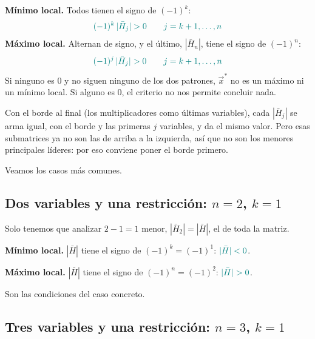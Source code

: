 \documentclass{article}
\newcommand{\vect}[1]{\vec{#1}}
\begin{document}
\begin{figure}[H]
\begin{minipage}[t]{0.49\textwidth}
\end{minipage}
\end{figure}

\noindent\textbf{Mínimo local.} Todos tienen el signo de \((-1)^k\):
\[\color{teal}
(-1)^k\,|\bar H_j|>0\qquad j=k+1,\dots,n
\]
\noindent\textbf{Máximo local.} Alternan de signo, y el último, \(|\bar H_n|\), tiene el signo de \((-1)^n\):
\[\color{teal}
(-1)^j\,|\bar H_j|>0\qquad j=k+1,\dots,n
\]
Si ninguno es \(0\) y no siguen ninguno de los dos patrones, \(\vect{x}^*\) no es un máximo ni un mínimo local. Si alguno es \(0\), el criterio no nos permite concluir nada.

Con el borde al final (los multiplicadores como últimas variables), cada \(|\bar H_j|\) se arma igual, con el borde y las primeras \(j\) variables, y da el mismo valor. Pero esas submatrices ya no son las de arriba a la izquierda, así que no son los menores principales líderes: por eso conviene poner el borde primero.

Veamos los casos más comunes.

\subsection*{Dos variables y una restricción: \(n=2\), \(k=1\)}

Solo tenemos que analizar \(2-1=1\) menor, \(|\bar H_2|=|\bar H|\), el de toda la matriz.

\noindent\textbf{Mínimo local.} \(|\bar H|\) tiene el signo de \((-1)^k=(-1)^1\): \({\color{teal}|\bar H|<0}\).

\noindent\textbf{Máximo local.} \(|\bar H|\) tiene el signo de \((-1)^n=(-1)^2\): \({\color{teal}|\bar H|>0}\).

Son las condiciones del caso concreto.

\subsection*{Tres variables y una restricción: \(n=3\), \(k=1\)}
\end{document}
